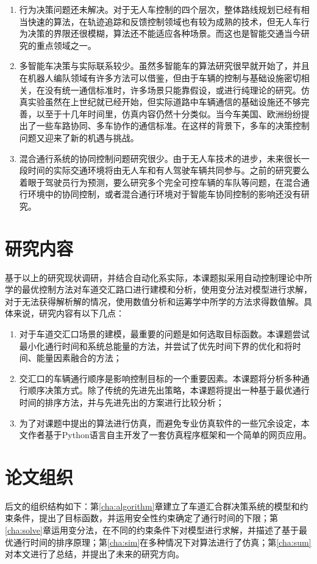 \begin{enumerate}[label=(\arabic*),wide=\parindent]
\item 行为决策问题还未解决。对于无人车控制的四个层次，整体路线规划已经有相当快速的算法，在轨迹追踪和反馈控制领域也有较为成熟的技术，但无人车行为决策的界限还很模糊，算法还不能适应各种场景。而这也是智能交通当今研究的重点领域之一。
\item 多智能车决策与实际联系较少。虽然多智能车的算法研究很早就开始了，并且在机器人编队领域有许多方法可以借鉴，但由于车辆的控制与基础设施密切相关，在没有统一通信标准时，许多场景只能靠假设，或进行纯理论的研究。仿真实验虽然在上世纪就已经开始，但实际道路中车辆通信的基础设施还不够完善，以至于十几年时间里，仿真内容仍然十分类似。当今车美国、欧洲纷纷提出了一些车路协同、多车协作的通信标准\cite{Chen2014Cooperative}。在这样的背景下，多车的决策控制问题又迎来了新的机遇与挑战。
\item 混合通行系统的协同控制问题研究很少。由于无人车技术的进步，未来很长一段时间的实际交通环境将由无人车和有人驾驶车辆共同参与。之前的研究要么着眼于驾驶员行为预测，要么研究多个完全可控车辆的车队等问题，在混合通行环境中的协同控制，或者混合通行环境对于智能车协同控制的影响还没有研究。
\end{enumerate}

\section{研究内容}
基于以上的研究现状调研，并结合自动化系实际，本课题拟采用自动控制理论中所学的最优控制方法对车道交汇路口进行建模和分析，使用变分法对模型进行求解，对于无法获得解析解的情况，使用数值分析和运筹学中所学的方法求得数值解。具体来说，研究内容有以下几点：
\begin{enumerate}[label=(\arabic*),wide=\parindent]
\item 对于车道交汇口场景的建模，最重要的问题是如何选取目标函数。本课题尝试最小化通行时间和系统总能量的方法，并尝试了优先时间下界的优化和将时间、能量因素融合的方法；
\item 交汇口的车辆通行顺序是影响控制目标的一个重要因素。本课题将分析多种通行顺序决策方式。除了传统的先进先出策略，本课题将提出一种基于最优通行时间的排序方法，并与先进先出的方案进行比较分析；
\item 为了对课题中提出的算法进行仿真，而避免专业仿真软件的一些冗余设定，本文作者基于{\ttfamily Python}语言自主开发了一套仿真程序框架和一个简单的网页应用。
\end{enumerate}

\section{论文组织}
后文的组织结构如下：第\ref{cha:algorithm}章建立了车道汇合群决策系统的模型和约束条件，提出了目标函数，并运用安全性约束确定了通行时间的下限；第\ref{cha:solve}章运用变分法，在不同的约束条件下对模型进行求解，并描述了基于最优通行时间的排序原理；第\ref{cha:sim}在多种情况下对算法进行了仿真；第\ref{cha:sum}对本文进行了总结，并提出了未来的研究方向。